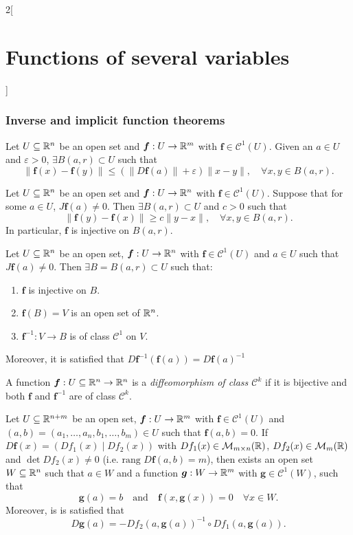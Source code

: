 \documentclass[../../../main.tex]{subfiles}
\begin{document}
\begin{multicols}{2}[\section{Functions of several variables}]
\subsubsection*{Inverse and implicit function theorems}
\begin{lemma}
Let $U\subseteq\mathbb{R}^n$ be an open set and $\boldsymbol{f}:U\rightarrow\mathbb{R}^m$ with $\boldsymbol{f}\in \mathcal{C}^1(U)$. Given an $a\in U$ and $\varepsilon>0$, $\exists B(a,r)\subset U$ such that $$\|\boldsymbol{f}(x)-\boldsymbol{f}(y)\|\leq(\|D\boldsymbol{f}(a)\|+\varepsilon)\|x-y\|,\quad\forall x,y\in B(a,r).$$
\end{lemma}
\begin{lemma}
Let $U\subseteq\mathbb{R}^n$ be an open set and $\boldsymbol{f}:U\rightarrow\mathbb{R}^n$ with $\boldsymbol{f}\in \mathcal{C}^1(U)$. Suppose that for some $a\in U$, $J\boldsymbol{f}(a)\ne 0$. Then $\exists B(a,r)\subset U$ and $c>0$ such that $$\|\boldsymbol{f}(y)-\boldsymbol{f}(x)\|\geq c\|y-x\|,\quad\forall x,y\in B(a,r).$$ In particular, $\boldsymbol{f}$ is injective on $B(a,r)$.
\end{lemma}
\begin{theorem}
Let $U\subseteq\mathbb{R}^n$ be an open set, $\boldsymbol{f}:U\rightarrow\mathbb{R}^n$ with $\boldsymbol{f}\in \mathcal{C}^1(U)$ and $a\in U$ such that $J\boldsymbol{f}(a)\ne0$. Then $\exists B=B(a,r)\subset U$ such that:
\begin{enumerate}
    \item $\boldsymbol{f}$ is injective on $B$.
    \item $\boldsymbol{f}(B)=V$ is an open set of $\mathbb{R}^n$.
    \item $\boldsymbol{f}^{-1}:V\rightarrow B$ is of class $\mathcal{C}^1$ on $V$.
\end{enumerate} Moreover, it is satisfied that $D\boldsymbol{f}^{-1}(\boldsymbol{f}(a))=D\boldsymbol{f}(a)^{-1}$
\end{theorem}
\begin{definition}
A function $\boldsymbol{f}:U\subseteq\mathbb{R}^n\rightarrow\mathbb{R}^n$ is a \textit{diffeomorphism of class $\mathcal{C}^k$} if it is bijective and both $\boldsymbol{f}$ and $\boldsymbol{f}^{-1}$ are of class $\mathcal{C}^k$.
\end{definition}
\begin{theorem}
Let $U\subseteq\mathbb{R}^{n+m}$ be an open set, $\boldsymbol{f}:U\rightarrow\mathbb{R}^m$ with $\boldsymbol{f}\in \mathcal{C}^1(U)$ and $(a,b)=(a_1,\ldots,a_n,b_1,\ldots,b_m)\in U$ such that $\boldsymbol{f}(a,b)=0$. If $D\boldsymbol{f}(x)=(Df_1(x)\;|\;Df_2(x))$ with $Df_1(x)\in\mathcal{M}_{m\times n}(\mathbb{R} )$, $Df_2(x)\in\mathcal{M}_m(\mathbb{R} )$ and $\det Df_2(x)\ne 0$ (i.e. $\text{rang }D\boldsymbol{f}(a,b)=m$), then exists an open set $W\subseteq\mathbb{R}^n$ such that $a\in W$ and a function $\boldsymbol{g}:W\rightarrow\mathbb{R}^m$ with $\boldsymbol{g}\in\mathcal{C}^1(W)$, such that $$\boldsymbol{g}(a)=b\quad\text{and}\quad \boldsymbol{f}(x,\boldsymbol{g}(x))=0\quad\forall x\in W.$$ Moreover, is is satisfied that $$D\boldsymbol{g}(a)=-Df_2(a,\boldsymbol{g}(a))^{-1}\circ Df_1(a,\boldsymbol{g}(a)).$$
\end{theorem}

\end{multicols}
\end{document}
